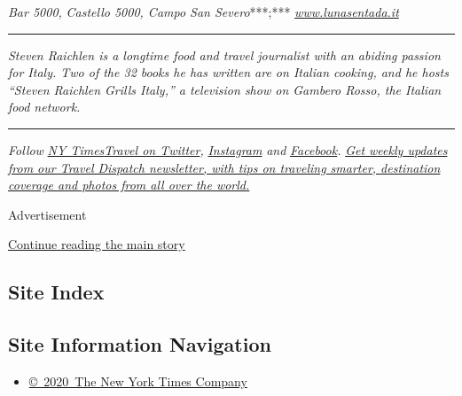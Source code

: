 \emph{Bar 5000,} \emph{Castello 5000, Campo San Severo}***;***
\emph{\href{http://www.lunasentada.it}{www.lunasentada.it}}

\begin{center}\rule{0.5\linewidth}{\linethickness}\end{center}

\emph{Steven Raichlen is a longtime food and travel journalist with an
abiding passion for Italy. Two of the 32 books he has written are on
Italian cooking, and he hosts ``Steven Raichlen Grills Italy,'' a
television show on Gambero Rosso, the Italian food network.}

\begin{center}\rule{0.5\linewidth}{\linethickness}\end{center}

\emph{Follow} \href{https://twitter.com/nytimestravel}{\emph{NY
Times}}\href{https://twitter.com/nytimestravel}{\emph{Travel on
Twitter}}\emph{,}
\href{https://www.instagram.com/nytimestravel/}{\emph{Instagram}}
\emph{and}
\href{https://www.facebookcorewwwi.onion/nytimestravel/}{\emph{Facebook}}\emph{.}
\href{https://www.nytimes3xbfgragh.onion/newsletters/traveldispatch}{\emph{Get
weekly updates from our Travel Dispatch newsletter, with tips on
traveling smarter, destination coverage and photos from all over the
world.}}

Advertisement

\protect\hyperlink{after-bottom}{Continue reading the main story}

\hypertarget{site-index}{%
\subsection{Site Index}\label{site-index}}

\hypertarget{site-information-navigation}{%
\subsection{Site Information
Navigation}\label{site-information-navigation}}

\begin{itemize}
\tightlist
\item
  \href{https://help.nytimes3xbfgragh.onion/hc/en-us/articles/115014792127-Copyright-notice}{©~2020~The
  New York Times Company}
\end{itemize}


